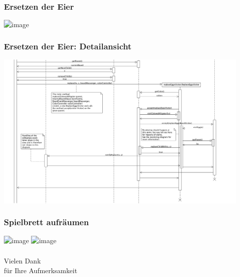 \documentclass[t]{beamer}
\begin{document}
\begin{frame}
	\frametitle{Ersetzen der Eier}
	\begin{center}
		\includegraphics<1>[width=0.5\textwidth]{Beta-Reduktion-withBlue.png}
	\end{center}
\end{frame}

\begin{frame}
	\frametitle{Ersetzen der Eier: Detailansicht}
	\includegraphics[width=0.95\textwidth]{ReplaceEggs.png}
\end{frame}

\begin{frame}
	\frametitle{Spielbrett aufräumen}
	\begin{center}
		\includegraphics<1>[width=0.5\textwidth]{Beta-Reduction-withYellow.png}
		\includegraphics<2>[width=0.4\textwidth]{Alligator2.png}
	\end{center}
\end{frame}

\begin{frame}
	\frametitle{}
	\begin{center}
	\begin{Huge}
		Vielen Dank\\ für Ihre Aufmerksamkeit
	\end{Huge}
	\end{center}
\end{frame}

\end{document}
